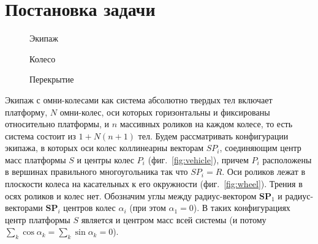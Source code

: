 
\section{Постановка задачи}

\begin{figure}[h]
        \centering
        \caption{Экипаж}
        \label{fig:vehicle}
    \endminipage
        \centering
        \caption{Колесо}
        \label{fig:wheel}
    \endminipage
        \centering
        \caption{Перекрытие}
        \label{fig:overlap}
    \endminipage
\end{figure}

Экипаж с омни-колесами как система абсолютно твердых тел включает платформу, $N$ омни-колес, оси которых горизонтальны и фиксированы относительно платформы, и $n$ массивных роликов на каждом колесе, то есть система состоит из $1 + N(n+1)$ тел. Будем рассматривать конфигурации экипажа, в которых оси колес коллинеарны векторам $SP_i$, соединяющим центр масс платформы $S$ и центры колес $P_i$ (фиг.~\ref{fig:vehicle}), причем $P_i$ расположены в вершинах правильного многоугольника так что $SP_i = R$. Оси роликов лежат в плоскости колеса на касательных к его окружности (фиг.~\ref{fig:wheel}). Трения в осях роликов и колес нет.
Обозначим углы между радиус-вектором $\mathbf{SP}_1$ и радиус-векторами $\mathbf{SP}_i$ центров колес $\alpha_i$ (при этом $\alpha_1 = 0$).
В таких конфигурациях центр платформы $S$ является и центром масс всей системы (и потому $\sum\limits_{k} \cos\alpha_k = \sum\limits_{k}\sin\alpha_k = 0$).

